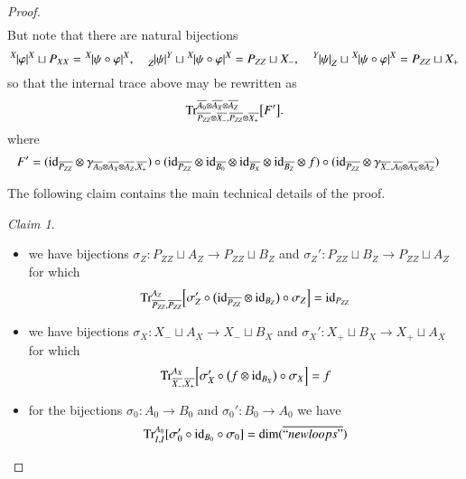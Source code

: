 \documentclass{amsart}
\def\tn{\textnormal}
\def\dim{\tn{dim}}
\def\Trace{\tn{Tr}}
\def\to{\rightarrow}
\def\ol{\overline}
\def\id{\tn{id}}
\newcommand{\inp}[1]{{#1_-}}
\newcommand{\outp}[1]{{#1_+}}
\newcommand{\feeddd}[3]{{\tensor*[^{#2}_{\color{white}{!}}]{{|#1|}}{^{#3}}}}%
\newcommand{\feeddc}[3]{{\tensor*[^{#2}]{{|#1|}}{_{#3}}}}
\newcommand{\feedcd}[3]{{\tensor*[_{#2}]{{|#1|}}{^{#3}}}}
\theoremstyle{remark}
\newtheorem{claim}[subsubsection]{Claim}
\theoremstyle{definition}
\begin{document}
\begin{proof}
\begin{align*}
\end{align*}
But note that there are natural bijections 
\[\feeddd{\varphi}{X}{X}\sqcup P_{XX}=\feeddd{\psi\circ\varphi}{X}{X},\quad \feedcd{\psi}{Z}{Y}\sqcup\feeddd{\psi\circ\varphi}{X}{X}=P_{ZZ}\sqcup\inp{X},\quad \feeddc{\psi}{Y}{Z}\sqcup\feeddd{\psi\circ\varphi}{X}{X}=P_{ZZ}\sqcup\outp{X}\]
so that the internal trace above may be rewritten as
\begin{equation}\label{eq:internal trace}
\Trace^{\ol{A_0}\otimes\ol{A_X}\otimes\ol{A_Z}}_{\ol{P_{ZZ}}\otimes\ol{\inp{X}},\ol{P_{ZZ}}\otimes\ol{\outp{X}}}
\big[F'\big].
\end{equation}
where
\begin{align*}
F'
&=(\id_{\ol{P_{ZZ}}}\otimes\gamma_{\ol{A_0}\otimes\ol{A_X}\otimes\ol{A_Z},\ol{\outp{X}}})\circ(\id_{\ol{P_{ZZ}}}\otimes\id_{\ol{B_0}}\otimes\id_{\ol{B_X}}\otimes\id_{\ol{B_Z}}\otimes f)\circ(\id_{\ol{P_{ZZ}}}\otimes\gamma_{\ol{\inp{X}},\ol{A_0}\otimes\ol{A_X}\otimes\ol{A_Z}})
\end{align*}


The following claim contains the main technical details of the proof.

\begin{claim}\mbox{}
 \begin{itemize}
  \item we have bijections $\sigma_Z:P_{ZZ}\sqcup A_Z\to P_{ZZ}\sqcup B_Z$ and $\sigma_Z':P_{ZZ}\sqcup B_Z\to P_{ZZ}\sqcup A_Z$ for which
  \[\Trace_{\ol{P_{ZZ}},\ol{P_{ZZ}}}^{A_Z}\Big[\sigma_Z'\circ\big(\id_{\ol{P_{ZZ}}}\otimes\id_{B_Z}\big)\circ\sigma_Z\Big]=\id_{P_{ZZ}}\]
  \item we have bijections $\sigma_X:\inp{X}\sqcup A_X\to \inp{X}\sqcup B_X$ and $\sigma_X':\outp{X}\sqcup B_X\to \outp{X}\sqcup A_X$ for which
  \[\Trace_{\ol{\inp{X}},\ol{\outp{X}}}^{A_X}\Big[\sigma_X'\circ\big(f\otimes\id_{B_X}\big)\circ\sigma_X\Big]=f\]
  \item for the bijections $\sigma_0:A_0\to B_0$ and $\sigma_0':B_0\to A_0$ we have
  \[\Trace_{I,I}^{A_0}[\sigma_0'\circ\id_{B_0}\circ\sigma_0]=\dim(\ol{``newloops"})\]
 \end{itemize}
\end{claim}


\end{proof}
\end{document}
